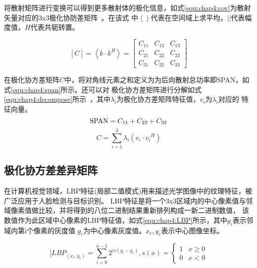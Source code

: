     将散射矩阵进行变换可以得到更多散射体的极化信息，如式\ref{equ:chap4:cov}为散射矢量对应的3x3极化协防差矩阵~\cite{Zhang2018Ship}。在该式
    中$\left\langle {} \right\rangle$代表在空间域上求平均，$\left| {} \right|$代表幅度值，$H$代表共轭转置。

    \begin{equation}
        \label{equ:chap4:cov}
        [C] = \left\langle {k \cdot {k^H}} \right\rangle  = \left[ {\begin{array}{*{20}{c}}
        {{C_{11}}}&{{C_{12}}}&{{C_{13}}}\\
        {{C_{21}}}&{{C_{22}}}&{{C_{23}}}\\
        {{C_{31}}}&{{C_{32}}}&{{C_{33}}}
        \end{array}} \right]
    \end{equation}

    在极化协方差矩阵$C$中，将对角线元素之和定义为为后向散射总功率即SPAN，如式\ref{equ:chap4:span}所示。还可以对
    极化协方差矩阵进行分解如式\ref{equ:chap4:decompose}所示~\cite{Liu2010Statistical}，其中$\lambda_i$为极化协方差矩阵特征值，$v_i$为$\lambda_i$对应的
    特征向量。
    \begin{equation}
        \label{equ:chap4:span}
        {\rm{SPAN}} = {C_{11}} + {C_{22}} + {C_{33}}
    \end{equation}
    \begin{equation}
        \label{equ:chap4:decompose}
      C = \sum\limits_{i = 1}^3 {{\lambda _i}({v_i} \cdot {v_i}^H)} 
    \end{equation}

    \subsection{极化协方差差异矩阵}
    在计算机视觉领域，LBP特征(局部二值模式)用来描述光学图像中的纹理特征，被广泛应用于人脸检测与目标识别。
    LBP特征是将一个3x3区域内的中心像素值与邻域像素值做比较，并将得到的八位二进制结果重新排列构成一新二进制数值，
    该数值作为此区域中心像素的LBP特征值，如式\ref{equ:chap4:LBP}所示，其中$g_i$表示邻域内第i个像素的灰度值
    $g_c$为中心像素灰度值。$x_c, y_c$表示中心图像坐标。

    \begin{equation}
        \label{equ:chap4:LBP}
        [LB{P_{({x_c},{y_c})}} = \sum\limits_{i = 0}^{n - 1} {{2^{is({g_i} - {g_c})}}} ,s(x) = \left\{ {\begin{array}{*{20}{c}}
        1&{x \ge 0}\\
        0&{x < 0}
        \end{array}} \right.
    \end{equation}

